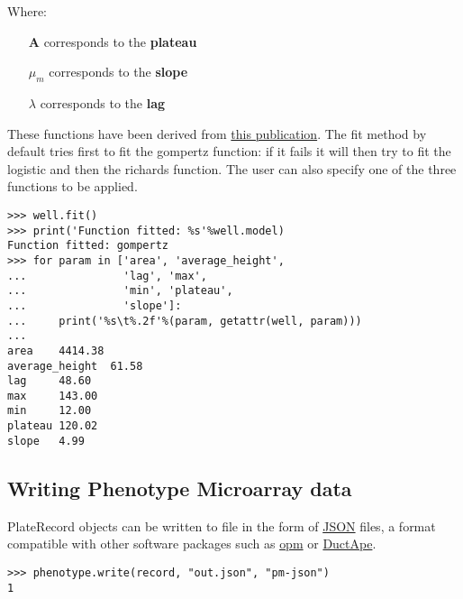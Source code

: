 Where:
\begin{itemize}
  \item[\textbf{A}] corresponds to the \textbf{plateau}

  \item[\textbf{$\mu_{m}$}] corresponds to the \textbf{slope}

  \item[\textbf{$\lambda$}] corresponds to the \textbf{lag}
  
\end{itemize} 

These functions have been derived from \href{http://www.ncbi.nlm.nih.gov/pubmed/16348228}{this publication}.
The fit method by default tries first to fit the gompertz function: if it fails it will then try to fit
the logistic and then the richards function. The user can also specify one of the three functions to be applied.

\begin{verbatim}
>>> well.fit()
>>> print('Function fitted: %s'%well.model)
Function fitted: gompertz
>>> for param in ['area', 'average_height',
...               'lag', 'max',
...               'min', 'plateau',
...               'slope']:
...     print('%s\t%.2f'%(param, getattr(well, param)))
... 
area    4414.38
average_height  61.58
lag     48.60
max     143.00
min     12.00
plateau 120.02
slope   4.99
\end{verbatim}

\subsection{Writing Phenotype Microarray data}
PlateRecord objects can be written to file in the form of
\href{https://en.wikipedia.org/wiki/JSON}{JSON}
files, a format compatible with other software packages such as
\href{https://www.dsmz.de/research/microorganisms/projects/analysis-of-omnilog-phenotype-microarray-data.html}{opm}
or \href{http://combogenomics.github.io/DuctApe/}{DuctApe}.
\begin{verbatim}
>>> phenotype.write(record, "out.json", "pm-json")
1
\end{verbatim}
